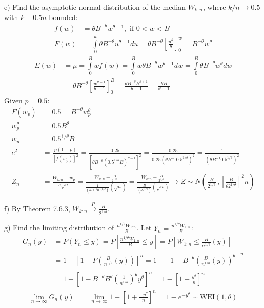 e) Find the asymptotic normal distribution of the median $W_{k:n}$, where $k/n \rightarrow 0.5$ with $k - 0.5n$ bounded:
\begin{align*}
f(w) &= \theta B^{-\theta} w^{\theta-1}, \text{ if } 0 < w < B \\
F(w) &= \int\limits^w_0 \theta B^{-\theta} u^{\theta-1} du
  = \theta B^{-\theta}  \left[ \frac{u^\theta}{\theta} \right]^w_0 = B^{-\theta} w^\theta
\end{align*}
\begin{align*}
E(w) &= \mu = \int\limits^B_0 w f(w) = \int\limits^B_0 w \theta B^{-\theta} w^{\theta-1} dw
  = \int\limits^B_0 \theta B^{-\theta} w^\theta dw \\
  &= \theta B^{-\theta}  \left[ \frac{w^{\theta + 1}}{\theta + 1} \right]^B_0
  = \frac{\theta B^{-\theta} B^{\theta + 1}}{\theta + 1} = \frac{\theta B}{\theta + 1}
\end{align*}
Given $p = 0.5$:
\begin{align*}
F(w_p) &= 0.5 = B^{-\theta} w_p^\theta \\
 w_p^\theta &= 0.5 B^{\theta}\\
w_p &= 0.5^{1/\theta} B \\
c^2 &= \frac{p (1 - p)}{[f(w_p)]^2} = \frac{0.25}{\left[ \theta B^{-\theta} \left( 0.5^{1/\theta} B\right)^{\theta - 1}\right]^2}
  = \frac{0.25}{0.25 \left( \theta B^{-1} 0.5^{1/\theta} \right)^2}
  = \frac{1}{\left( \theta B^{-1} 0.5^{1/\theta} \right)^2} \\
Z_n &= \frac{W_{k:n} - w_p}{c\sqrt{n}}
  = \frac{W_{k:n} - \frac{B}{2^{1/\theta}}}{\frac{1}{\left( \theta B^{-1} 0.5^{1/\theta} \right)} \left( \sqrt{n} \right)} 
  = \frac{W_{k:n} - \frac{B}{2^{1/\theta}}}{\frac{B}{\left( \theta 2^{1/\theta} \right)} \left( \sqrt{n} \right)}
  \rightarrow Z \sim N\left( \frac{B}{2^{1/\theta}}\,, \left[\frac{B}{\theta 2^{1/\theta}}\right]^2 n \right)
\end{align*}

f) By Theorem 7.6.3,  $W_{k:n} \overset{P}{\longrightarrow} \frac{B}{2^{1/\theta}}$.

g) Find the limiting distribution of $\frac{n^{1/\theta} W_{1:n}}{B}$. Let $Y_n = \frac{n^{1/\theta} W_{1:n}}{B}$:
\begin{align*}
G_n(y) &= P\left(Y_n \le y \right) = P\left[ \frac{n^{1/\theta} W_{1:n}}{B} \le y \right]
  = P\left[ W_{1:n} \le \frac{B}{n^{1/\theta}}(y) \right] \\
  &= 1 - \left[ 1 - F\left( \frac{B}{n^{1/\theta}}(y)\right) \right]^n
  = 1 - \left[ 1 - B^{-\theta} \left( \frac{B}{n^{1/\theta}}(y)\right)^\theta \right]^n \\
  &= 1 - \left[ 1 - B^{-\theta}  B^{\theta} \left(\frac{1}{n^{1/\theta}}\right)^\theta y^\theta \right]^n
  =  1 - \left[ 1 - \frac{y^\theta}{n} \right]^n
\end{align*}
\begin{align*}
\lim_{n \to \infty}{G_n(y)}  &= \lim_{n \to \infty}{1 - \left[ 1 + \frac{-y^\theta}{n}\right]^n}
  = 1 - e^{-y^\theta} \sim \text{WEI}(1, \theta)
\end{align*}

